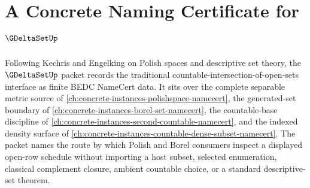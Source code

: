 \chapter{A Concrete Naming Certificate for $\GDeltaSetUp$}
\label{ch:concrete-instances-g-delta-set-namecert}

Following Kechris and Engelking on Polish spaces and descriptive set theory, the $\GDeltaSetUp$ packet records the traditional countable-intersection-of-open-sets interface as finite BEDC NameCert data. It sits over the complete separable metric source of \autoref{ch:concrete-instances-polishspace-namecert}, the generated-set boundary of \autoref{ch:concrete-instances-borel-set-namecert}, the countable-base discipline of \autoref{ch:concrete-instances-second-countable-namecert}, and the indexed density surface of \autoref{ch:concrete-instances-countable-dense-subset-namecert}. The packet names the route by which Polish and Borel consumers inspect a displayed open-row schedule without importing a host subset, selected enumeration, classical complement closure, ambient countable choice, or a standard descriptive-set theorem.

